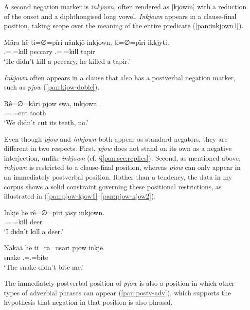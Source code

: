 \documentclass[output=paper,colorlinks,citecolor=brown,draft]{langscibook}
\begin{document}
A second negation marker is \textit{inkjown}, often rendered as [kjowm] with a reduction of the onset and a diphthongised long vowel. \textit{Inkjown} appears in a clause-final position, taking scope over the meaning of the entire predicate (\ref{pan:inkjown1}). 

\ea\label{pan:inkjown1}
    \gll Mära hë ti=∅=pïri nänkjô {inkjown}, ti=∅=pïri ikkjyti. \\
    \Tsg{} \Erg{} \Tsg.\Erg{}=\Tsg.\Abs{}=kill peccary \Neg{}  \Tsg.\Erg{}=\Tsg.\Abs{}=kill tapir \\
    \glt `He didn't kill a peccary, he killed a tapir.' \\
\z

\textit{Inkjown} often appears in a clause that also has a postverbal negation marker, such as \textit{pjow} (\ref{pan:kjow-doble}). 

\ea\label{pan:kjow-doble}
    \gll Rê=∅=kâri pjow swa, inkjown. \\
    \Fpl.\Erg{}=\Tsg.\Abs{}=cut \Neg{} tooth \Neg{} \\
    \glt `We didn't cut its teeth, no.' \\
\z

Even though \textit{pjow} and \textit{inkjown} both appear as standard negators, they are different in two respects. First, \textit{pjow} does not stand on its own as a negative interjection, unlike \textit{inkjown} (cf. \S{}\ref{pan:sec:replies}). Second, as mentioned above, \textit{inkjown} is restricted to a clause-final position, whereas \textit{pjow} can only appear in an immediately postverbal position. Rather than a tendency, the data in my corpus shows a solid constraint governing these positional restrictions, as illustrated in (\ref{pan:pjow-kjow1}--\ref{pan:pjow-kjow2}).

\ea\label{pan:pjow-kjow1}
    \gll  Inkjë hë rê=∅=pïri  jäsy inkjown. \\
    \Fsg{} \Erg{} \Fsg.\Erg{}=\Tsg.\Abs{}=kill deer \Neg{} \\
    \glt `I didn't kill a deer.'  \\
\z

\ea\label{pan:pjow-kjow2}
    \gll  Näkää hë ti=ra=nsari {pjow} inkjë. \\
    snake \Erg{} \Tsg.\Erg{}=\Fsg.\Abs{}=bite \Neg{} \Fsg{} \\
    \glt `The snake didn't bite me.' \\
\z

The immediately postverbal position of \textit{pjow} is also a position in which other types of adverbial phrases can appear (\ref{pan:postv-adv}), which supports the hypothesis that negation in that position is also phrasal.
\end{document}
